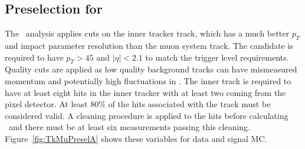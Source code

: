\subsection{Preselection for \tktof\ \label{sec:tktofpreselection}}

The \tktof\ analysis applies cuts on the inner tracker track, which has a much better $p_T$ and impact parameter resolution than the muon system track.
The candidate is required to have $p_T > 45$ and  $|\eta| < 2.1$ to match the trigger level requirements. 
Quality cuts are applied as low quality background tracks can have mismeasured momentum and potentially high fluctuations in \dedx.
The inner track is required to have at least eight hits in the inner tracker with at least two coming from the pixel detector. At least 80\% of the hits associated with the track
must be considered valid. A cleaning procedure is applied to the hits before calculating \dedx\ and there must be at least six measurements passing this cleaning.
Figure~\ref{fig:TkMuPreselA} shows these variables for data and signal MC.


